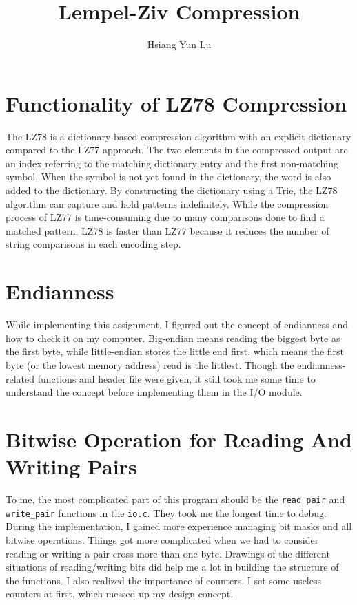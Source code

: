 \documentclass[12pt]{article}
\title{Lempel-Ziv Compression}
\author{Hsiang Yun Lu}
\begin{document}
\maketitle

\section{Functionality of LZ78 Compression}

The LZ78 is a dictionary-based compression algorithm with an explicit dictionary compared to the LZ77 approach. The two elements in the compressed output are an index referring to the matching dictionary entry and the first non-matching symbol. When the symbol is not yet found in the dictionary, the word is also added to the dictionary. By constructing the dictionary using a Trie, the LZ78 algorithm can capture and hold patterns indefinitely. While the compression process of LZ77 is time-consuming due to many comparisons done to find a matched pattern, LZ78 is faster than LZ77 because it reduces the number of string comparisons in each encoding step. 

\section{Endianness}

While implementing this assignment, I figured out the concept of endianness and how to check it on my computer. Big-endian means reading the biggest byte as the first byte, while little-endian stores the little end first, which means the first byte (or the lowest memory address) read is the littlest. Though the endianness-related functions and header file were given, it still took me some time to understand the concept before implementing them in the I/O module.

\section{Bitwise Operation for Reading And Writing Pairs}

To me, the most complicated part of this program should be the \texttt{read\_pair} and \texttt{write\_pair} functions in the \texttt{io.c}. They took me the longest time to debug. During the implementation, I gained more experience managing bit masks and all bitwise operations. Things got more complicated when we had to consider reading or writing a pair cross more than one byte. Drawings of the different situations of reading/writing bits did help me a lot in building the structure of the functions. I also realized the importance of counters. I set some useless counters at first, which messed up my design concept. 
\end{document}
